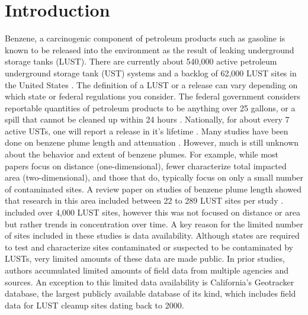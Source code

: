 \documentclass[draft,linenumbers]{agujournal2018}
\begin{document}
\section{Introduction}

Benzene, a carcinogenic component of petroleum products such as gasoline
is known to be released into the environment as the result of leaking
underground storage tanks (LUST). There are currently about 540,000
active petroleum underground storage tank (UST) systems and a backlog of
62,000 LUST sites in the United States \citep{ustperformance}. The
definition of a LUST or a release can vary depending on which state or
federal regulations you consider. The federal government considers
reportable quantities of petroleum products to be anything over 25
gallons, or a spill that cannot be cleaned up within 24 hours
\citep{coderegs}. Nationally, for about every 7 active USTs, one will
report a release in it's lifetime \citep{ustperformance}. Many studies
have been done on benzene plume length and attenuation
\citep[e.g.,][]{connor2015, kamath2012, shih2004evaluation}. However,
much is still unknown about the behavior and extent of benzene plumes.
For example, while most papers focus on distance (one-dimensional),
fewer characterize total impacted area (two-dimensional), and those that
do, typically focus on only a small number of contaminated sites. A
review paper on studies of benzene plume length showed that research in
this area included between 22 to 289 LUST sites per study
\citep{connor2015}. \citet{mchugh2014progress} included over 4,000 LUST
sites, however this was not focused on distance or area but rather
trends in concentration over time. A key reason for the limited number
of sites included in these studies is data availability. Although states
are required to test and characterize sites contaminated or suspected to
be contaminated by LUSTs, very limited amounts of these data are made
public. In prior studies, authors accumulated limited amounts of field
data from multiple agencies and sources. An exception to this limited
data availability is California's Geotracker database, the largest
publicly available database of its kind, which includes field data for
LUST cleanup sites dating back to 2000.
\end{document}
